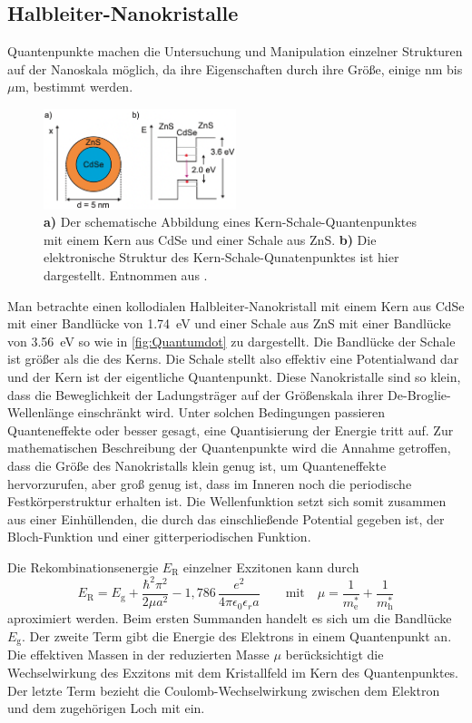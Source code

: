 \subsection{Halbleiter-Nanokristalle}
    Quantenpunkte machen die Untersuchung und Manipulation einzelner Strukturen auf der Nanoskala möglich, da ihre Eigenschaften durch ihre Größe, einige nm bis $\mu$m, bestimmt werden.
    \begin{figure}[ht]
        \centering\captionsetup{format=plain}
        \includegraphics[width=0.5\textwidth]{bilder/Quantumdot.png}
        \caption{\textbf{a)} Der schematische Abbildung eines Kern-Schale-Quantenpunktes mit einem Kern aus CdSe und einer Schale aus ZnS. \textbf{b)} Die elektronische Struktur des Kern-Schale-Qunatenpunktes ist hier dargestellt. Entnommen aus \cite{anleitung}.}
        \label{fig:Quantumdot}
    \end{figure}
    \FloatBarrier
    Man betrachte einen kollodialen Halbleiter-Nanokristall mit einem Kern aus CdSe mit einer Bandlücke von \qty{1,74}{eV} und einer Schale aus ZnS mit einer Bandlücke von \qty{3,56}{eV} so wie in \autoref{fig:Quantumdot} zu dargestellt.
    Die Bandlücke der Schale ist größer als die des Kerns.
    Die Schale stellt also effektiv eine Potentialwand dar und der Kern ist der eigentliche Quantenpunkt.
    Diese Nanokristalle sind so klein, dass die Beweglichkeit der Ladungsträger auf der Größenskala ihrer De-Broglie-Wellenlänge einschränkt wird.
    Unter solchen Bedingungen passieren Quanteneffekte oder besser gesagt, eine Quantisierung der Energie tritt auf.
    Zur mathematischen Beschreibung der Quantenpunkte wird die Annahme getroffen, dass die Größe des Nanokristalls klein genug ist, um Quanteneffekte hervorzurufen, aber groß genug ist, dass im Inneren noch die periodische Festkörperstruktur erhalten ist.
    Die Wellenfunktion setzt sich somit zusammen aus einer Einhüllenden, die durch das einschließende Potential gegeben ist, der Bloch-Funktion und einer gitterperiodischen Funktion.

    Die Rekombinationsenergie $E_{\mathrm{R}}$ einzelner Exzitonen kann durch 
    \begin{equation}
        E_{\mathrm{R}} = E_{\mathrm{g}} + \frac{\hbar^2 \pi^2}{2 \mu a^2} - 1,786\, \frac{e^2}{4\pi \epsilon_0 \epsilon_r a} \qquad \mathrm{mit} \quad \mu = \frac{1}{m^*_{\mathrm{e}}} + \frac{1}{m^*_{\mathrm{h}}}
        \label{eqn:PL_formel}
    \end{equation}
    aproximiert werden.
    Beim ersten Summanden handelt es sich um die Bandlücke $E_{\mathrm{g}}$.
    Der zweite Term gibt die Energie des Elektrons in einem Quantenpunkt an.
    Die effektiven Massen in der reduzierten Masse $\mu$ berücksichtigt die Wechselwirkung des Exzitons mit dem Kristallfeld im Kern des Quantenpunktes.
    Der letzte Term bezieht die Coulomb-Wechselwirkung zwischen dem Elektron und dem zugehörigen Loch mit ein.
    
